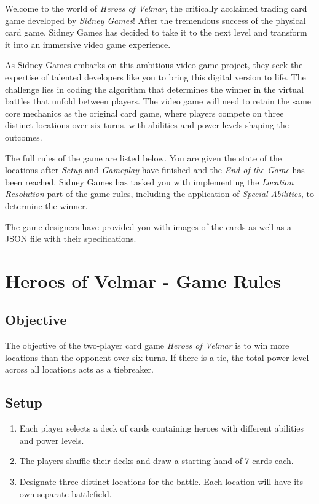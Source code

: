 

Welcome to the world of \emph{Heroes of Velmar}, the critically acclaimed trading card game developed by \emph{Sidney Games}!
After the tremendous success of the physical card game, Sidney Games has decided to take it to the next level and transform it into an immersive video game experience.

As Sidney Games embarks on this ambitious video game project, they seek the expertise of talented developers like you to bring this digital version to life.
The challenge lies in coding the algorithm that determines the winner in the virtual battles that unfold between players.
The video game will need to retain the same core mechanics as the original card game, where players compete on three distinct locations over six turns, with abilities and power levels shaping the outcomes.

The full rules of the game are listed below.
You are given the state of the locations after \emph{Setup} and \emph{Gameplay} have finished and the \emph{End of the Game} has been reached.
Sidney Games has tasked you with implementing the \emph{Location Resolution} part of the game rules, including the application of \emph{Special Abilities}, to determine the winner.

The game designers have provided you with images of the cards as well as a JSON file with their specifications.

\section*{Heroes of Velmar - Game Rules}

\subsection*{Objective}
The objective of the two-player card game \emph{Heroes of Velmar} is to win more locations than the opponent over six turns. If there is a tie, the total power level across all locations acts as a tiebreaker.

\subsection*{Setup}
\begin{enumerate}
  \item Each player selects a deck of cards containing heroes with different abilities and power levels.
  \item The players shuffle their decks and draw a starting hand of 7 cards each.
  \item Designate three distinct locations for the battle. Each location will have its own separate battlefield.
\end{enumerate}

